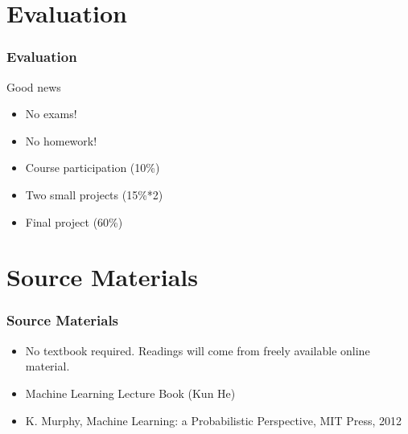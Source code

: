 \documentclass[9pt]{beamer}
\begin{document}
\begin{CJK*}{GBK}{kai}
\section{Evaluation}
\begin{frame}
	\frametitle{Evaluation}
	\begin{block}{Good news}
		\begin{itemize}
			
			\item No exams!
			
			\item No homework!
			
			
		\end{itemize}
	\end{block}
	
	\begin{itemize}
		\item Course participation (10\%) 
		\item Two small projects (15\%*2) 
		\item Final project (60\%)
	\end{itemize}
\end{frame}


\section{Source Materials}
\begin{frame}
	\frametitle{Source Materials}
	\begin{itemize}
		\item No textbook required. Readings will come from freely available online material. 
		
		\item Machine Learning Lecture Book (Kun He) %
		 
		\item K. Murphy, Machine Learning: a Probabilistic Perspective, MIT Press, 2012
		

\end{itemize}
\end{frame}
\end{CJK*}
\end{document}
